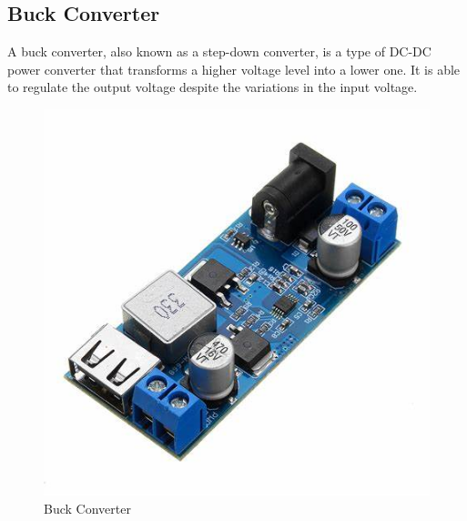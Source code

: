  \subsection{Buck Converter}
  A buck converter, also known as a step-down converter, is a type of DC-DC power converter that transforms a higher voltage level into a lower one. It is able to regulate the output voltage despite the variations in the input voltage.
  \begin{figure}[h]
    \centering
    \includegraphics[width=1\linewidth]{Graphics/buckconverter.jpeg}
    \caption{Buck Converter}
    \label{fig:enter-label}
\end{figure}
